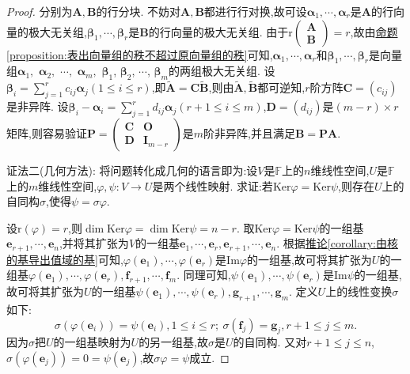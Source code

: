 \documentclass[../../main.tex]{subfiles}%
\begin{document}
\begin{proof}
分别为\(\boldsymbol{A},\boldsymbol{B}\)的行分块. 不妨对\(\boldsymbol{A},\boldsymbol{B}\)都进行行对换,故可设\(\boldsymbol{\alpha}_1,\cdots,\boldsymbol{\alpha}_r\)是\(\boldsymbol{A}\)的行向量的极大无关组,\(\boldsymbol{\beta}_1,\cdots,\boldsymbol{\beta}_r\)是\(\boldsymbol{B}\)的行向量的极大无关组. 由于\(\text{r}\begin{pmatrix}\boldsymbol{A}\\\boldsymbol{B}\end{pmatrix}=r\),故由\hyperref[proposition:表出向量组的秩不超过原向量组的秩]{命题\ref{proposition:表出向量组的秩不超过原向量组的秩}}可知,\(\boldsymbol{\alpha}_1,\cdots,\boldsymbol{\alpha}_r\)和\(\boldsymbol{\beta}_1,\cdots,\boldsymbol{\beta}_r\)是向量组$\boldsymbol{\alpha}_1,$ $\boldsymbol{\alpha}_2,$ $\cdots,$ $\boldsymbol{\alpha}_m,$ $\boldsymbol{\beta}_1$, $\boldsymbol{\beta}_2$, $\cdots$, $\boldsymbol{\beta}_m$的两组极大无关组. 设\(\boldsymbol{\beta}_i=\sum_{j = 1}^{r}c_{ij}\boldsymbol{\alpha}_j(1\leqslant  i\leqslant  r)\),即$\widetilde{\boldsymbol{A}}=\boldsymbol{C}\widetilde{\boldsymbol{B}}$,则由$\widetilde{\boldsymbol{A}},\widetilde{\boldsymbol{B}}$都可逆知,\(r\)阶方阵\(\boldsymbol{C}=(c_{ij})\)是非异阵. 设\(\boldsymbol{\beta}_i-\boldsymbol{\alpha}_i=\sum_{j = 1}^{r}d_{ij}\boldsymbol{\alpha}_j(r + 1\leqslant  i\leqslant  m)\),\(\boldsymbol{D}=(d_{ij})\)是\((m - r)\times r\)矩阵,则容易验证\(\boldsymbol{P}=\begin{pmatrix}\boldsymbol{C}&\boldsymbol{O}\\\boldsymbol{D}&\boldsymbol{I}_{m - r}\end{pmatrix}\)是\(m\)阶非异阵,并且满足\(\boldsymbol{B}=\boldsymbol{P}\boldsymbol{A}\).

{\color{blue}证法二(几何方法):}  将问题转化成几何的语言即为:设\(V\)是\(\mathbb{F}\)上的\(n\)维线性空间,\(U\)是\(\mathbb{F}\)上的\(m\)维线性空间,\(\varphi,\psi:V\to U\)是两个线性映射. 求证:若\(\text{Ker}\varphi=\text{Ker}\psi\),则存在\(U\)上的自同构\(\sigma\),使得\(\psi=\sigma\varphi\).

设\(\text{r}(\varphi)=r\),则\(\dim\text{Ker}\varphi=\dim\text{Ker}\psi=n - r\). 取\(\text{Ker}\varphi=\text{Ker}\psi\)的一组基\(\boldsymbol{e}_{r + 1},\cdots,\boldsymbol{e}_n\),并将其扩张为\(V\)的一组基\(\boldsymbol{e}_1,\cdots,\boldsymbol{e}_r,\boldsymbol{e}_{r + 1},\cdots,\boldsymbol{e}_n\). 根据\hyperref[corollary:由核的基导出值域的基]{推论\ref{corollary:由核的基导出值域的基}}可知,\(\varphi(\boldsymbol{e}_1),\cdots,\varphi(\boldsymbol{e}_r)\)是\(\text{Im}\varphi\)的一组基,故可将其扩张为\(U\)的一组基\(\varphi(\boldsymbol{e}_1),\cdots,\varphi(\boldsymbol{e}_r),\boldsymbol{f}_{r + 1},\cdots,\boldsymbol{f}_m\). 同理可知,\(\psi(\boldsymbol{e}_1),\cdots,\psi(\boldsymbol{e}_r)\)是\(\text{Im}\psi\)的一组基,故可将其扩张为\(U\)的一组基\(\psi(\boldsymbol{e}_1),\cdots,\psi(\boldsymbol{e}_r),\boldsymbol{g}_{r + 1},\cdots,\boldsymbol{g}_m\). 定义\(U\)上的线性变换\(\sigma\)如下:
\[
\sigma(\varphi(\boldsymbol{e}_i))=\psi(\boldsymbol{e}_i),1\leqslant  i\leqslant  r;\ \sigma(\boldsymbol{f}_j)=\boldsymbol{g}_j,r + 1\leqslant  j\leqslant  m.
\]
因为\(\sigma\)把\(U\)的一组基映射为\(U\)的另一组基,故\(\sigma\)是\(U\)的自同构. 又对\(r + 1\leqslant  j\leqslant  n\),\(\sigma(\varphi(\boldsymbol{e}_j))=0=\psi(\boldsymbol{e}_j)\),故\(\sigma\varphi=\psi\)成立. 


\end{proof}
\end{document}
